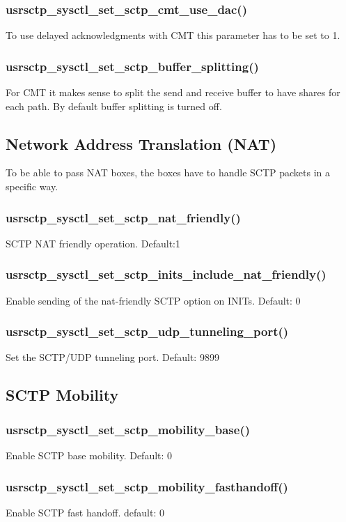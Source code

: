 \documentclass[a4paper]{article}
\begin{document}
\subsubsection{usrsctp\_sysctl\_set\_sctp\_cmt\_use\_dac()}
To use delayed acknowledgments with CMT this parameter has to be set to 1.

\subsubsection{usrsctp\_sysctl\_set\_sctp\_buffer\_splitting()}
For CMT it makes sense to split the send and receive buffer to have shares for each path. 
By default buffer splitting is turned off.


\subsection{Network Address Translation (NAT)}
To be able to pass NAT boxes, the boxes have to handle SCTP packets in a specific way.

\subsubsection{usrsctp\_sysctl\_set\_sctp\_nat\_friendly()}
SCTP NAT friendly operation. Default:1

\subsubsection{usrsctp\_sysctl\_set\_sctp\_inits\_include\_nat\_friendly()}
Enable sending of the nat-friendly SCTP option on INITs. Default: 0

\subsubsection{usrsctp\_sysctl\_set\_sctp\_udp\_tunneling\_port()}
Set the SCTP/UDP tunneling port. Default: 9899

\subsection{SCTP Mobility}
\subsubsection{usrsctp\_sysctl\_set\_sctp\_mobility\_base()}
Enable SCTP base mobility. Default: 0


\subsubsection{usrsctp\_sysctl\_set\_sctp\_mobility\_fasthandoff()}
Enable SCTP fast handoff. default: 0
\end{document}
